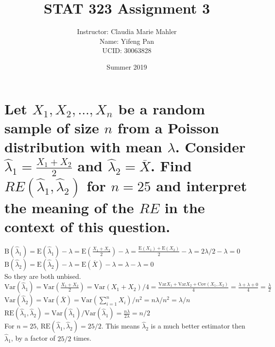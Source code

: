 \documentclass[10pt, letterpaper, titlepage]{article}
\title{STAT 323 Assignment 3}
\author{Instructor: Claudia Marie Mahler
    \\Name: Yifeng Pan
    \\UCID: 30063828}
\date{Summer 2019}
\newcommand{\mX}{\overline{X}}
\newcommand{\E}{\text{E}}
\newcommand{\RE}{\text{RE}}
\newcommand{\B}{\text{B}}
\newcommand{\Var}{\text{Var}}
\newcommand{\Cov}{\text{Cov}}
\begin{document}
    \maketitle
    \section{Let $X_1 , X_2 , \hdots , X_n$ be a random sample of size $n$ from a Poisson distribution with mean $\lambda$.
        Consider $\hat\lambda_1 = \frac{X_1 + X_2}{2}$ and $\hat \lambda_2 = \mX$. Find $RE(\hat\lambda_1, \hat\lambda_2)$
        for $n = 25$ and interpret the meaning of the $RE$ in the context of this question.}
        \(
            \B(\hat\lambda_1) = \E(\hat\lambda_1) -\lambda = \E(\frac{X_1 + X_2}{2}) - \lambda
            = \frac{\E(X_1) + \E(X_2)}{2} - \lambda = 2\lambda /2 - \lambda = 0
        \)\\
        \(
            \B(\hat\lambda_2) = \E(\hat\lambda_2) -\lambda = \E(\mX) - \lambda = \lambda - \lambda = 0
        \)\\
        So they are both unbised.\\
        \(
            \Var(\hat\lambda_1) = \Var(\frac{X_1 + X_2}{2}) = \Var(X_1 + X_2) / 4
            = \frac{\Var{X_1} + \Var{X_2} + \Cov(X_1, X_2)}{4}
            = \frac{\lambda + \lambda + 0}{4}
            = \frac{\lambda}{2}
        \)\\
        \(
            \Var(\hat\lambda_2) = \Var(\mX) = \Var(\sum_{i = 1}^n X_i) / n^2
            = n\lambda / n^2 = \lambda / n
        \)\\
        \(
            \RE(\hat\lambda_1, \hat\lambda_2) = \Var(\hat\lambda_1) / \Var(\hat\lambda_1) 
            = \frac{n\lambda}{2\lambda} = n / 2
        \)\\
        For $n = 25$, $\RE(\hat\lambda_1, \hat\lambda_2) = 25/2$. This means $\hat\lambda_2$ is 
        a much better estimator then $\hat\lambda_1$, by a factor of $25/2$ times.

\end{document}
